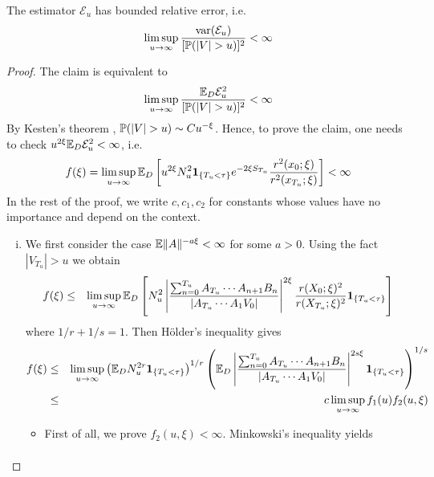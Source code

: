 \documentclass{article}
\begin{document}
\begin{theorem}
  The estimator $\mathcal E_u$ has bounded relative error, i.e.
  \begin{equation*}
    \limsup_{u \to \infty} {\var(\mathcal E_u) \over [\P(|V| > u)]^2} < \infty
  \end{equation*}
\end{theorem}
\begin{proof}
  The claim is equivalent to
  \[
  \limsup_{u \to \infty} {\E_D \mathcal E_u^2 \over [\P(|V| > u)]^2} < \infty
  \]
  By Kesten's theorem \cite{Kesten1973}, $\P(|V| > u) \sim C
  u^{-\xi}$. Hence, to prove the claim, one needs to check
  $u^{2\xi}\E_D \mathcal E_u^2 < \infty$, i.e.
  \[
  f(\xi) = \limsup_{u \to \infty} \E_D  \left[u^{2\xi}
    N_u^2 \1{T_u < \tau} e^{-2\xi S_{T_u}} {r^2(x_0; \xi)
      \over r^2(x_{T_u}; \xi)}\right]
  < \infty
  \]
  In the rest of the proof, we write $c, c_1, c_2$ for constants whose values
  have no importance and depend on the context.
  \begin{enumerate}[(i)]
  \item We first consider the case $\E \|A\|^{-a\xi} < \infty$ for some
    $a > 0$. Using the fact $|V_{T_u}| > u$  we obtain
    \begin{eqnarray*}
      f(\xi) &\leq& \limsup_{u \to \infty} \E_D \left[
        N_u^2  \left|
          \frac{
            \sum_{n=0}^{T_u} A_{T_u} \cdots A_{n+1} B_n 
          }{
            |A_{T_u} \cdots A_1 V_0|
          }
        \right|^{2 \xi}
        \frac{
          r(X_0; \xi)^2
        }{
          r(X_{T_u}; \xi)^2
        } \1{T_u < \tau}
      \right] \\
    \end{eqnarray*}
    where $1/r + 1/s = 1$. Then H\"older's inequality gives
    \begin{eqnarray*}
      f(\xi) &\leq& \limsup_{u \to \infty}
      \left(\E_D N_u^{2r} \1{T_u < \tau}\right)^{1/r}
      \left(\E_D \left|
          \frac{
            \sum_{n=0}^{T_u} A_{T_u} \cdots A_{n+1} B_n 
          }{
            |A_{T_u} \cdots A_1 V_0|
          }
        \right|^{2 s \xi} \1{T_u < \tau}
      \right)^{1/s} \\
      &\leq& c \limsup_{u \to \infty} f_1(u) f_2(u, \xi)
    \end{eqnarray*}
    \begin{itemize}
    \item First of all, we prove $f_2(u,\xi) < \infty$. Minkowski's
      inequality yields
      \begin{eqnarray*}

\end{eqnarray*}
\end{itemize}
\end{enumerate}
\end{proof}
\end{document}
